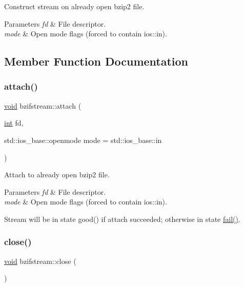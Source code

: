 Construct stream on already open bzip2 file. 


\begin{DoxyParams}{Parameters}
{\em fd} & File descriptor. \\
\hline
{\em mode} & Open mode flags (forced to contain ios\+::in). \\
\hline
\end{DoxyParams}


\subsection{Member Function Documentation}
\mbox{\label{classbzifstream_a1f7afe283be87635e25b3f48bc16ea8c}} 
\subsubsection{\texorpdfstring{attach()}{attach()}}
{\footnotesize\ttfamily \hyperlink{lp__lib_8h_ac7828c7b2b31d2e11af17bdb6289c5d9}{void} bzifstream\+::attach (\begin{DoxyParamCaption}\item[{\hyperlink{lp__lib_8h_adeb9ec6400320e4923ac9d836d509ddb}{int}}]{fd,  }\item[{std\+::ios\+\_\+base\+::openmode}]{mode = {\ttfamily std\+:\+:ios\+\_\+base\+:\+:in} }\end{DoxyParamCaption})}



Attach to already open bzip2 file. 


\begin{DoxyParams}{Parameters}
{\em fd} & File descriptor. \\
\hline
{\em mode} & Open mode flags (forced to contain ios\+::in).\\
\hline
\end{DoxyParams}
Stream will be in state good() if attach succeeded; otherwise in state \hyperlink{_constraint_macros_8h_a73a3b169ac8c3419cbe15327e75ffcfd}{fail()}. \mbox{\label{classbzifstream_a227014b7b7ff86c2d94f33f2b8cfe7b4}} 
\subsubsection{\texorpdfstring{close()}{close()}}
{\footnotesize\ttfamily \hyperlink{lp__lib_8h_ac7828c7b2b31d2e11af17bdb6289c5d9}{void} bzifstream\+::close (\begin{DoxyParamCaption}{ }\end{DoxyParamCaption})}



